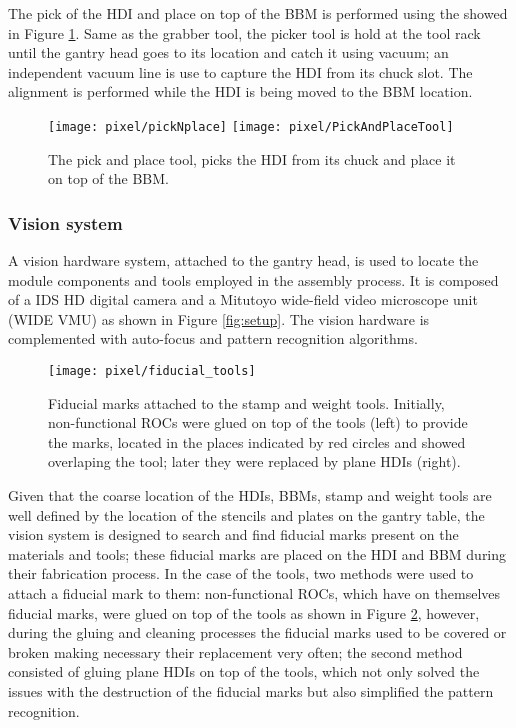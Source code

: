 The pick of the HDI and place on top of the BBM is performed using the  showed in Figure \ref{fig:pandp_tool}. Same as the grabber tool, the picker tool is hold at the tool rack until the gantry head goes to its location and catch it using vacuum; an independent vacuum line is use to capture the HDI from its chuck slot. The alignment is performed while the HDI is being moved to the BBM location.      
\begin{figure}[!h]
  \centering  
  \texttt{[image: pixel/pickNplace]}
  \texttt{[image: pixel/PickAndPlaceTool]}
  \caption[Pick and place tool.]{The pick and place tool, picks the HDI from its chuck and place it on top of the BBM.}\label{fig:pandp_tool}
\end{figure}

\subsubsection*{Vision system}

A vision hardware system, attached to the gantry head, is used to locate the module components and tools employed in the assembly process. It is composed of a IDS HD digital camera and a Mitutoyo wide-field video microscope unit (WIDE VMU) as shown in Figure \ref{fig:setup}. The vision hardware is complemented with auto-focus and pattern recognition algorithms. 

\begin{figure}[!h]
  \centering  
  \texttt{[image: pixel/fiducial\_tools]}\\
  \caption[Fiducial marks on tools.]{Fiducial marks attached to the stamp and weight tools. Initially, non-functional ROCs were glued on top of the tools (left) to provide the marks, located in the places indicated by red circles and showed overlaping the tool; later they were replaced by plane HDIs (right).}\label{fig:fiducial_tools}
\end{figure}

Given that the coarse location of the HDIs, BBMs, stamp and weight tools are well defined by the location of the stencils and plates on the gantry table, the vision system is designed to search and find fiducial marks present on the materials and tools; these fiducial marks are placed on the HDI and BBM during their fabrication process. In the case of the tools, two methods were used to attach a fiducial mark to them: non-functional ROCs, which have on themselves fiducial marks, were glued on top of the tools as shown in Figure \ref{fig:fiducial_tools}, however, during the gluing and cleaning processes the fiducial marks used to be covered or broken making necessary their replacement very often; the second method consisted of gluing plane HDIs on top of the tools, which not only solved the issues with the destruction of the fiducial marks but also simplified the pattern recognition.

